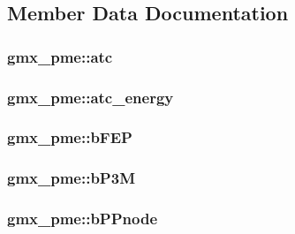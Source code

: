\subsection{\-Member \-Data \-Documentation}
\hypertarget{structgmx__pme_a443c097bcdc099a94684e9053fece127}{
\subsubsection[{atc}]{ {\bf gmx\-\_\-pme\-::atc}}}\label{structgmx__pme_a443c097bcdc099a94684e9053fece127}
\hypertarget{structgmx__pme_aa8a05cceb80bf94695bcdd1d5bb2c126}{
\subsubsection[{atc\-\_\-energy}]{ {\bf gmx\-\_\-pme\-::atc\-\_\-energy}}}\label{structgmx__pme_aa8a05cceb80bf94695bcdd1d5bb2c126}
\hypertarget{structgmx__pme_aca424ae5cab42d38870b30f03525858b}{
\subsubsection[{b\-F\-E\-P}]{ {\bf gmx\-\_\-pme\-::b\-F\-E\-P}}}\label{structgmx__pme_aca424ae5cab42d38870b30f03525858b}
\hypertarget{structgmx__pme_af00c3a627847810d95604387fb010a2e}{
\subsubsection[{b\-P3\-M}]{ {\bf gmx\-\_\-pme\-::b\-P3\-M}}}\label{structgmx__pme_af00c3a627847810d95604387fb010a2e}
\hypertarget{structgmx__pme_a7499bad5129d046e37a0bcbbdc36fde2}{
\subsubsection[{b\-P\-Pnode}]{ {\bf gmx\-\_\-pme\-::b\-P\-Pnode}}}\label{structgmx__pme_a7499bad5129d046e37a0bcbbdc36fde2}
